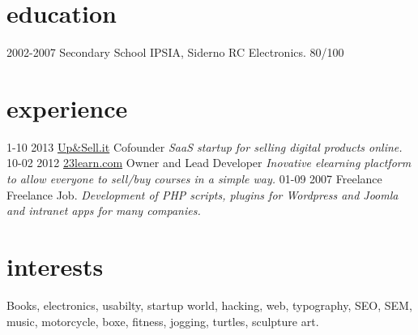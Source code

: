\documentclass[print]{cv}
\begin{document}
\section{education}

\begin{entrylist}

  \entry
    {2002-2007}
    {Secondary School}
    {IPSIA, Siderno RC}
    {Electronics. 80/100}

\end{entrylist}

\section{experience}

\begin{entrylist}
  \entry
    {1-10 2013}
     {\href{http://www.23learn.com}{Up\&Sell.it}}
    {Cofounder}
    {\emph{SaaS startup for selling digital products online. }}
  \entry
    {10-02 2012}
     {\href{http://www.23learn.com}{23learn.com}}
    {Owner and Lead Developer}
    {\emph{Inovative elearning plactform to allow everyone to sell/buy courses in a simple way. }}
  \entry
    {01-09 2007}
    {Freelance}
    {Freelance Job.}
    {\emph{Development of PHP scripts, plugins for Wordpress and Joomla and intranet apps for many companies.}}
\end{entrylist}

\section{interests}

Books, electronics, usabilty, startup world, hacking, web, typography, SEO, SEM, music, motorcycle, boxe, fitness, jogging,
turtles, sculpture art.
\end{document}

